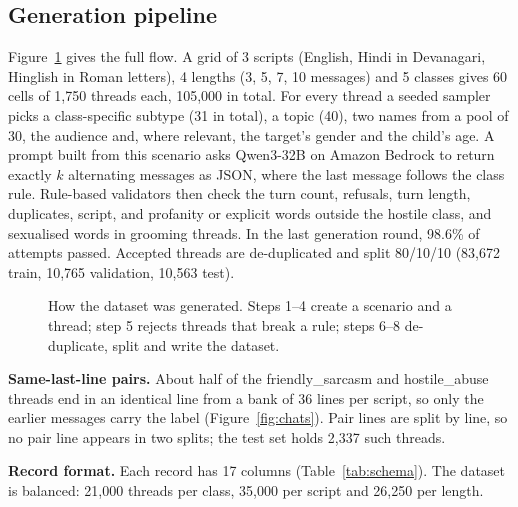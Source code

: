 \documentclass[sigconf,9pt]{acmart}
\begin{document}
\subsection{Generation pipeline}
Figure~\ref{fig:datagen} gives the full flow. A grid of 3 scripts (English, Hindi in Devanagari, Hinglish in Roman letters), 4 lengths (3, 5, 7, 10 messages) and 5 classes gives 60 cells of 1{,}750 threads each, 105{,}000 in total. For every thread a seeded sampler picks a class-specific subtype (31 in total), a topic (40), two names from a pool of 30, the audience and, where relevant, the target's gender and the child's age. A prompt built from this scenario asks Qwen3-32B \cite{qwen3} on Amazon Bedrock to return exactly $k$ alternating messages as JSON, where the last message follows the class rule. Rule-based validators then check the turn count, refusals, turn length, duplicates, script, and profanity or explicit words outside the hostile class, and sexualised words in grooming threads. In the last generation round, 98.6\% of attempts passed. Accepted threads are de-duplicated and split 80/10/10 (83{,}672 train, 10{,}765 validation, 10{,}563 test).

\begin{figure}[!t]
  \centering
  \resizebox{\textwidth}{!}{}
  \caption{How the dataset was generated. Steps 1--4 create a scenario and a thread; step 5 rejects threads that break a rule; steps 6--8 de-duplicate, split and write the dataset.}
  \label{fig:datagen}
\end{figure}

\par\textbf{Same-last-line pairs.} About half of the friendly\_sarcasm and hostile\_abuse threads end in an identical line from a bank of 36 lines per script, so only the earlier messages carry the label (Figure~\ref{fig:chats}). Pair lines are split by line, so no pair line appears in two splits; the test set holds 2{,}337 such threads.

\par\textbf{Record format.} Each record has 17 columns (Table~\ref{tab:schema}). The dataset is balanced: 21{,}000 threads per class, 35{,}000 per script and 26{,}250 per length.
\end{document}
